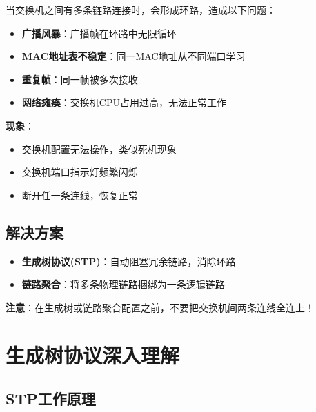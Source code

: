 \documentclass[12pt,a4paper]{ctexart}
\begin{document}
\begin{keybox}
当交换机之间有多条链路连接时，会形成环路，造成以下问题：
\begin{itemize}[itemsep=0pt]
    \item \textbf{广播风暴}：广播帧在环路中无限循环
    \item \textbf{MAC地址表不稳定}：同一MAC地址从不同端口学习
    \item \textbf{重复帧}：同一帧被多次接收
    \item \textbf{网络瘫痪}：交换机CPU占用过高，无法正常工作
\end{itemize}

\textbf{现象}：
\begin{itemize}[itemsep=0pt]
    \item 交换机配置无法操作，类似死机现象
    \item 交换机端口指示灯频繁闪烁
    \item 断开任一条连线，恢复正常
\end{itemize}
\end{keybox}

\subsection{解决方案}

\begin{itemize}[leftmargin=2em,itemsep=0pt]
    \item \textbf{生成树协议(STP)}：自动阻塞冗余链路，消除环路
    \item \textbf{链路聚合}：将多条物理链路捆绑为一条逻辑链路
\end{itemize}

\begin{keybox}
\textbf{注意}：在生成树或链路聚合配置之前，不要把交换机间两条连线全连上！
\end{keybox}

\section{生成树协议深入理解}

\subsection{STP工作原理}
\end{document}
